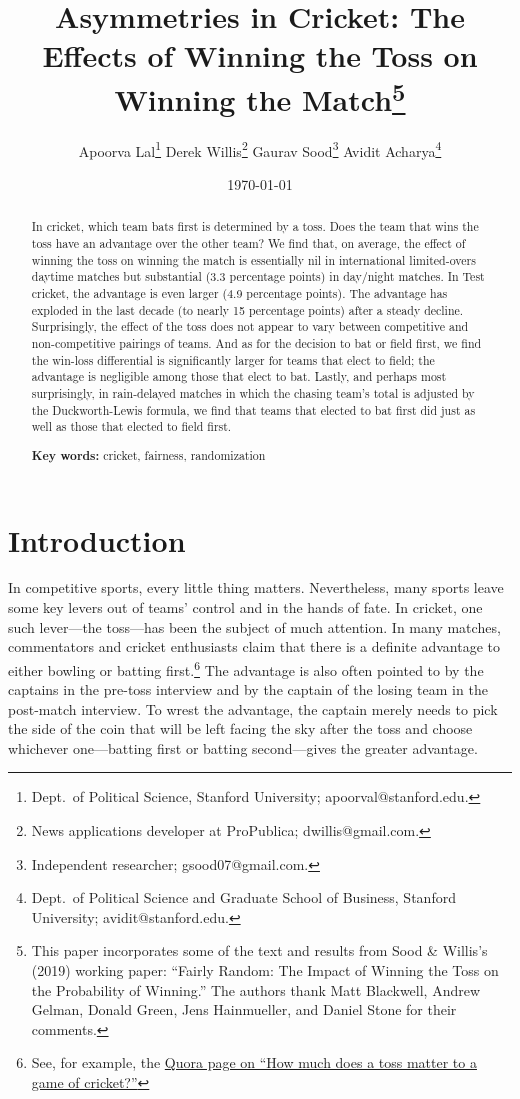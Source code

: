 \documentclass[11pt,  letterpaper]{article}
\title{Asymmetries in Cricket: The Effects of Winning the Toss on Winning the Match\thanks{This paper incorporates some of the text and results from Sood \& Willis's (2019) working paper: ``Fairly Random: The Impact of Winning the Toss on the Probability of Winning.'' The authors thank Matt Blackwell, Andrew Gelman, Donald Green, Jens Hainmueller, and Daniel Stone for their comments.}}
\author{
Apoorva Lal\thanks{Dept.~of Political Science, Stanford University;  \textsf{apoorval@stanford.edu}.} \;\;
Derek Willis\thanks{News applications developer at ProPublica;  \textsf{dwillis@gmail.com}.}  \;\;
Gaurav Sood\thanks{Independent researcher;  \textsf{gsood07@gmail.com}.} \;\;
Avidit Acharya\thanks{Dept.~of Political Science and Graduate School of Business, Stanford University; \textsf{avidit@stanford.edu}.}
}
\date{\today}
\begin{document}
\maketitle

\begin{abstract}

In cricket, which team bats first is determined by a toss. Does the team that wins the toss have an advantage over the other team? We find that, on average, the effect of winning the toss on winning the match is essentially nil in international limited-overs daytime matches but substantial (3.3 percentage points) in day/night matches. In Test cricket, the advantage is even larger (4.9 percentage points). The advantage has exploded in the last decade (to nearly 15 percentage points) after a steady decline. Surprisingly, the effect of the toss does not appear to vary between competitive and non-competitive pairings of teams. And as for the decision to bat or field first, we find the win-loss differential is significantly larger for teams that elect to field; the advantage is negligible among those that elect to bat. Lastly, and perhaps most surprisingly, in rain-delayed matches in which the chasing team's total is adjusted by the Duckworth-Lewis formula, we find that teams that elected to bat first did just as well as those that elected to field first.

\smallskip

\textbf{Key words:} cricket, fairness, randomization

\end{abstract}




\section{Introduction}

In competitive sports, every little thing matters. Nevertheless, many sports leave some key levers out of teams' control and in the hands of fate. In cricket, one such lever---the toss---has been the subject of much attention. In many matches, commentators and cricket enthusiasts claim that there is a definite advantage to either bowling or batting first.\footnote{See, for example, the \href{https://www.quora.com/How-much-does-a-toss-matter-to-a-game-of-cricket}{Quora page on ``How much does a toss matter to a game of cricket?''}} The advantage is also often pointed to by the captains in the pre-toss interview and by the captain of the losing team in the post-match interview. To wrest the advantage, the captain merely needs to pick the side of the coin that will be left facing the sky after the toss and choose whichever one---batting first or batting second---gives the greater advantage. 
\end{document}
